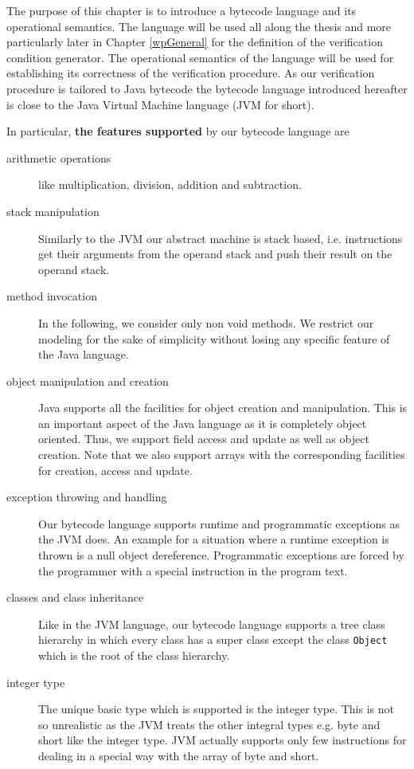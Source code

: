 
 The purpose of this chapter is to introduce a bytecode language 
 and its operational semantics. The language will be used all along the thesis and more particularly
  later in Chapter \ref{wpGeneral} for the definition of the verification condition generator.
 The operational semantics of the language will be used 
 for establishing  its correctness of the verification procedure.
 As our verification procedure is tailored to Java bytecode 
 the bytecode language introduced hereafter is close to the Java Virtual Machine 
 language \cite{VMSpec}(JVM for short). 
 
In particular, \textbf{the features supported} by our bytecode language are 
\begin{description} 
   \item  [arithmetic operations] like multiplication, division, addition and subtraction. 

   \item  [stack manipulation] Similarly to the JVM  our abstract machine is stack based, i.e. instructions
          get their arguments from the operand stack and push their result on the  operand stack.

   \item  [method invocation] In the following, we consider only  non void methods. 
          We restrict our modeling for the sake of simplicity without losing any specific feature of the Java language.
          
   \item  [object manipulation and creation] 
          Java supports all the facilities for object creation and manipulation.
	  This is an important aspect of the Java language as it is completely object oriented.
	  Thus, we support field access and update as well as object creation. Note that we also 
	  support arrays with the corresponding facilities for creation, access and update. 

   \item  [exception throwing and handling] Our bytecode language supports runtime and programmatic exceptions as the JVM does.
	  An example for a situation where a runtime exception is thrown is a null object dereference.  Programmatic exceptions
	  are forced by the programmer with a special instruction in the program text.
   
   \item  [classes and class inheritance] Like in the JVM language, our bytecode language supports  a tree class hierarchy in which every class 
          has a super class except the class \texttt{Object} which is the root of the class hierarchy.

   \item  [integer type] The unique basic type which is supported is the integer type.
          This is not so unrealistic as the JVM
	  treats the other integral types e.g. byte and short like the integer type. 
	  JVM actually supports only few instructions 
          for dealing in a special way with the array of byte and short.
	  
\end{description} 
 

